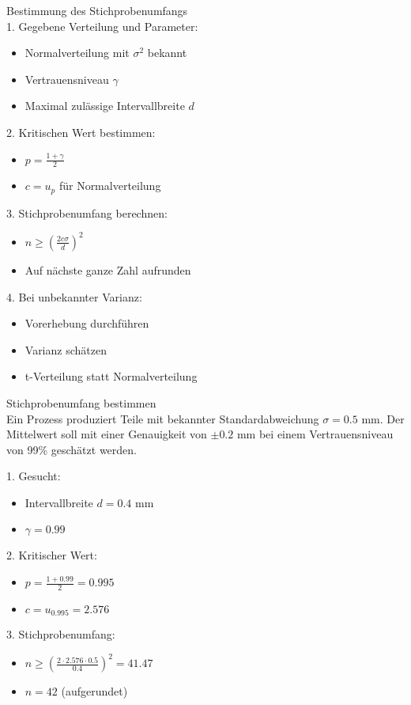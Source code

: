 \begin{KR}{Bestimmung des Stichprobenumfangs}\\
1. Gegebene Verteilung und Parameter:
   \begin{itemize}
     \item Normalverteilung mit $\sigma^2$ bekannt
     \item Vertrauensniveau $\gamma$
     \item Maximal zulässige Intervallbreite $d$
   \end{itemize}

2. Kritischen Wert bestimmen:
   \begin{itemize}
     \item $p = \frac{1+\gamma}{2}$
     \item $c = u_p$ für Normalverteilung
   \end{itemize}

3. Stichprobenumfang berechnen:
   \begin{itemize}
     \item $n \geq (\frac{2c\sigma}{d})^2$
     \item Auf nächste ganze Zahl aufrunden
   \end{itemize}

4. Bei unbekannter Varianz:
   \begin{itemize}
     \item Vorerhebung durchführen
     \item Varianz schätzen
     \item t-Verteilung statt Normalverteilung
   \end{itemize}
\end{KR}

\begin{example2}{Stichprobenumfang bestimmen}\\
Ein Prozess produziert Teile mit bekannter Standardabweichung $\sigma = 0.5$ mm. Der Mittelwert soll mit einer Genauigkeit von $\pm 0.2$ mm bei einem Vertrauensniveau von 99\% geschätzt werden.

1. Gesucht:
   \begin{itemize}
     \item Intervallbreite $d = 0.4$ mm
     \item $\gamma = 0.99$
   \end{itemize}

2. Kritischer Wert:
   \begin{itemize}
     \item $p = \frac{1+0.99}{2} = 0.995$
     \item $c = u_{0.995} = 2.576$
   \end{itemize}

3. Stichprobenumfang:
   \begin{itemize}
     \item $n \geq (\frac{2 \cdot 2.576 \cdot 0.5}{0.4})^2 = 41.47$
     \item $n = 42$ (aufgerundet)
   \end{itemize}
\end{example2}





